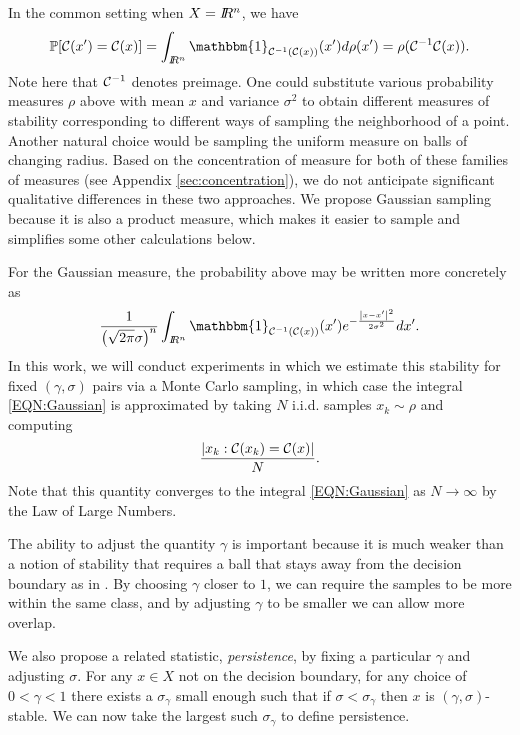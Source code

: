 In the common setting when $X=I\!\!R^n$, we have
\[\mathbb{P}[\CC(x')=\CC(x)] = \int_{\RR^n} \mathbbm{1}_{\CC^{-1}(\CC(x))} (x') d\rho (x') = \rho(\CC^{-1}\CC(x)).\]
Note here that $\mathcal{C}^{-1}$ denotes preimage. %
One could substitute various probability measures $\rho$ above with mean $x$ and variance $\sigma^2$ to obtain different measures of stability corresponding to different ways of sampling the neighborhood of a point.  Another natural choice would be sampling the uniform measure on balls of changing radius. Based on the concentration of measure for both of these families of measures (see Appendix \ref{sec:concentration}), we do not anticipate significant qualitative differences in these two approaches. We propose Gaussian sampling because it is also a product measure, which makes it easier to sample and simplifies some other calculations below.

For the Gaussian measure, the probability above may be written more concretely as
\begin{equation}\label{EQN:Gaussian}
\frac{1}{\left(\sqrt{2\pi}\sigma\right)^{n}} \int_{\RR^n} \mathbbm{1}_{\CC^{-1}(\CC(x))} (x')e^{-\frac{\norm{x - x'}^2}{2\sigma^2}} dx'.
\end{equation}
In this work, we will conduct experiments in which we estimate this stability for fixed $(\gamma,\sigma)$ pairs via a Monte Carlo sampling, in which case the integral \eqref{EQN:Gaussian} is approximated by taking $N$ i.i.d. samples $x_k \sim \rho$ and computing
\[
    \frac{\left\vert x_k : \mathcal{C}(x_k) = \mathcal{C}(x) \right\vert}{N}.
\]
Note that this quantity converges to the integral \eqref{EQN:Gaussian} as $N\to\infty$ by the Law of Large Numbers.

The ability to adjust the quantity $\gamma$ is important because it is much weaker than a notion of stability that requires a ball that stays away from the decision boundary as in \cite{Khoury2018}. By choosing $\gamma$ closer to $1$, we can require the samples to be more within the same class, and by adjusting $\gamma$ to be smaller we can allow more overlap.

We also propose a related statistic, \emph{persistence}, by fixing a particular $\gamma$ and adjusting $\sigma$. For any $x\in X$ not on the decision boundary, for any choice of $0<\gamma<1$ there exists a $\sigma_\gamma$ small enough such that if $\sigma < \sigma_\gamma$ then $x$ is $(\gamma,\sigma)$-stable. We can now take the largest such $\sigma_\gamma$ to define persistence.

